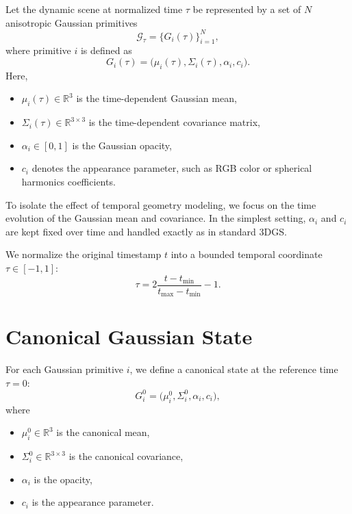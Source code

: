 \documentclass[11pt]{article}
\begin{document}
Let the dynamic scene at normalized time $\tau$ be represented by a set of $N$ anisotropic Gaussian primitives
\begin{equation}
\mathcal{G}_{\tau}=\{G_i(\tau)\}_{i=1}^N,
\end{equation}
where primitive $i$ is defined as
\begin{equation}
G_i(\tau)=\bigl(\mu_i(\tau),\Sigma_i(\tau),\alpha_i,c_i\bigr).
\end{equation}
Here,
\begin{itemize}[leftmargin=1.5em]
    \item $\mu_i(\tau)\in\mathbb{R}^3$ is the time-dependent Gaussian mean,
    \item $\Sigma_i(\tau)\in\mathbb{R}^{3\times 3}$ is the time-dependent covariance matrix,
    \item $\alpha_i\in[0,1]$ is the Gaussian opacity,
    \item $c_i$ denotes the appearance parameter, such as RGB color or spherical harmonics coefficients.
\end{itemize}

To isolate the effect of temporal geometry modeling, we focus on the time evolution of the Gaussian mean and covariance. In the simplest setting, $\alpha_i$ and $c_i$ are kept fixed over time and handled exactly as in standard 3DGS.

We normalize the original timestamp $t$ into a bounded temporal coordinate $\tau\in[-1,1]$:
\begin{equation}
\tau = 2\frac{t-t_{\min}}{t_{\max}-t_{\min}}-1.
\end{equation}

\section{Canonical Gaussian State}

For each Gaussian primitive $i$, we define a canonical state at the reference time $\tau=0$:
\begin{equation}
G_i^0=\bigl(\mu_i^0,\Sigma_i^0,\alpha_i,c_i\bigr),
\end{equation}
where
\begin{itemize}[leftmargin=1.5em]
    \item $\mu_i^0\in\mathbb{R}^3$ is the canonical mean,
    \item $\Sigma_i^0\in\mathbb{R}^{3\times 3}$ is the canonical covariance,
    \item $\alpha_i$ is the opacity,
    \item $c_i$ is the appearance parameter.
\end{itemize}
\end{document}
